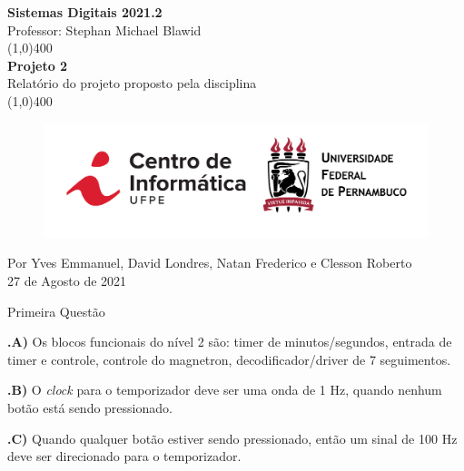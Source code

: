 \documentclass[a4paper, 1pt]{article}
\begin{document}
\begin{titlepage}
\begin{center}
\vspace*{1cm}
\Large{\textbf{Sistemas Digitais 2021.2}\\Professor: Stephan Michael Blawid}\\
\vfill
\line(1,0){400}\\[1mm]
\huge{\textbf{Projeto 2}}\\[3mm]
\Large{Relatório do projeto proposto pela disciplina}\\[1mm]
\line(1,0){400}
\vfill
\begin{figure}[!htb]
    \centering
    \includegraphics[scale=0.2]{imgs/logo cin-ufpe.png}\\
    \label{fig:logo}
\end{figure}
Por Yves Emmanuel, David Londres, Natan Frederico e Clesson Roberto\\27 de Agosto de 2021
\end{center}
\end{titlepage}


\setcounter{page}{1}

\begin{section}{Primeira Questão}

\textbf{.A)} Os blocos funcionais do nível 2 são:  timer de minutos/segundos, entrada de timer e controle, controle do magnetron, decodificador/driver de 7 seguimentos.

\textbf{.B)} O \emph{clock} para o temporizador deve ser uma onda de 1 Hz, quando nenhum botão está sendo pressionado.

\textbf{.C)} Quando qualquer botão estiver sendo pressionado, então um sinal de 100 Hz deve ser direcionado para o temporizador.
\end{section}
\end{document}
